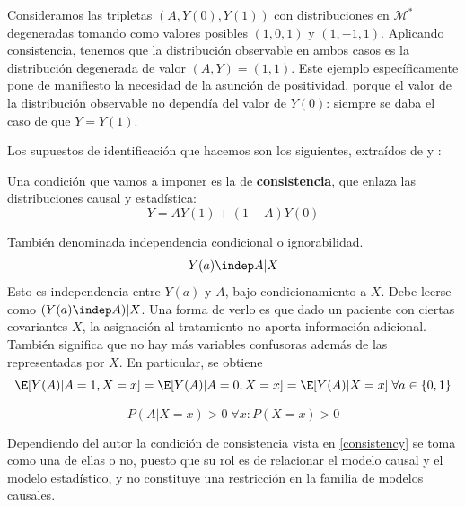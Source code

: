 \begin{ejemplo}\cite[sección 2.2]{mci}
	Consideramos las tripletas $(A, Y(0),Y(1))$ con distribuciones en $\mathcal{M}^*$
	degeneradas tomando como valores posibles $(1, 0, 1)$ y $(1, -1, 1)$. Aplicando consistencia,
	tenemos que la distribución observable en ambos casos es la distribución degenerada de valor
	$(A, Y) = (1, 1)$.
	Este ejemplo específicamente pone de manifiesto la necesidad de la asunción de positividad,
	porque el valor de la distribución observable no dependía del valor de $Y(0)$: siempre
	se daba el caso de que $Y = Y(1)$.
\end{ejemplo}

Los supuestos de identificación que hacemos son los siguientes, extraídos
de \cite[material suplementario S1]{luque2021} y \cite[capítulo 2.2]{mci}:

\begin{definicion}[Consistencia]
	\label{consistency}
	Una condición que vamos a imponer es la de \textbf{consistencia}, que enlaza
	las distribuciones causal y estadística:
	$$ Y = A Y(1) + (1 - A)Y(0) $$
\end{definicion}

\begin{definicion}
	También denominada independencia condicional o ignorabilidad. %
	$$ Y(a) \indep A | X $$
	Esto es independencia entre $Y(a)$ y $A$, bajo condicionamiento a $X$. Debe leerse como
	$(Y(a) \indep A) | X$.
	Una forma de verlo es que dado un paciente con ciertas covariantes $X$, la asignación al
	tratamiento no aporta información adicional.
	También significa que no hay más variables confusoras además de las representadas por $X$. %
	En particular, se obtiene
	$$
		\E[Y(A) | A = 1, X = x] = \E[Y(A) | A = 0, X = x] = \E[Y(A) | X = x] \;\forall a \in \{0, 1\}
	$$
\end{definicion}

\begin{definicion}[Positividad]
	$$ P(A | X = x) > 0 \; \forall x:  P(X = x) > 0$$
\end{definicion}

Dependiendo del autor la condición de consistencia vista en \ref{consistency}
se toma como una de ellas o no, puesto que su rol es de relacionar el modelo causal
y el modelo estadístico, y no constituye una restricción en la familia de modelos causales.


